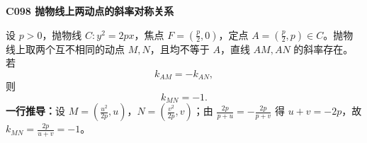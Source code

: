 \noindent\textbf{C098 抛物线上两动点的斜率对称关系}\par
\noindent 设 $p>0$，抛物线 $C:y^2=2px$，焦点 $F=(\frac p2,0)$，定点 $A=(\frac p2,p)\in C$。抛物线上取两个互不相同的动点 $M,N$，且均不等于 $A$，直线 $AM,AN$ 的斜率存在。若
\[
 \boxed{k_{AM}=-k_{AN}},
\]
则
\[
 \boxed{k_{MN}=-1}.
\]
\noindent\textbf{一行推导：}设 $M=(\frac{u^2}{2p},u)$，$N=(\frac{v^2}{2p},v)$；由
$\frac{2p}{p+u}=-\frac{2p}{p+v}$ 得 $u+v=-2p$，故 $k_{MN}=\frac{2p}{u+v}=-1$。\par

